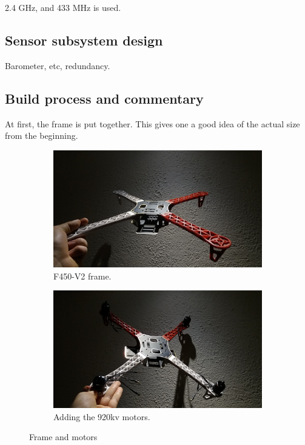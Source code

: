 2.4 GHz, and 433 MHz is used.

\subsection{Sensor subsystem design}

Barometer, etc, redundancy.

\subsection{Build process and commentary}

At first, the frame is put together. This gives one a good idea of the actual size from the beginning.

\begin{figure}[H]
\begin{subfigure}{0.5\textwidth}
\centering
\includegraphics[scale=0.1]{images/drone-build-frame.jpg}
\caption{F450-V2 frame.}
\label{fig:frame}
\end{subfigure}
\begin{subfigure}{0.5\textwidth}
\centering
\includegraphics[scale=0.1]{images/drone-build-motors.jpg}
\caption{Adding the 920kv motors.}
\label{fig:motors}
\end{subfigure}
\caption{Frame and motors}
\label{fig:frame_motors}
\end{figure}

